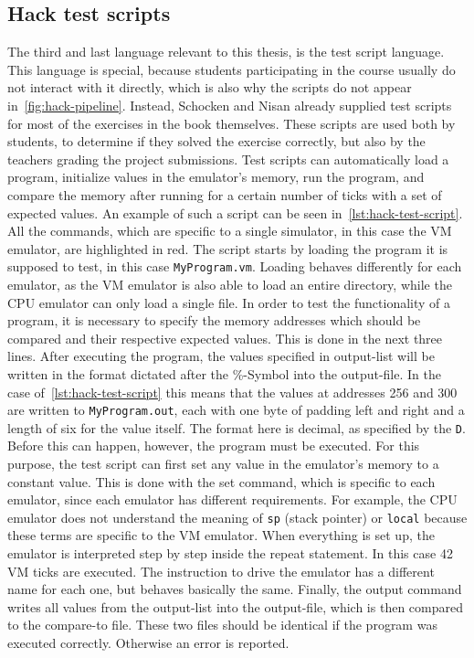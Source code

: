 \subsection{Hack test scripts} \label{test-scripts}
The third and last language relevant to this thesis, is the test script language.
This language is special, because students participating in the course usually do not interact with it directly, which is also why the scripts do not appear in~\cref{fig:hack-pipeline}.
Instead, Schocken and Nisan already supplied test scripts for most of the exercises in the book themselves.
These scripts are used both by students, to determine if they solved the exercise correctly, but also by the teachers grading the project submissions.
Test scripts can automatically load a program, initialize values in the emulator's memory, run the program, and compare the memory after running for a certain number of ticks with a set of expected values.
An example of such a script can be seen in~\cref{lst:hack-test-script}.
All the commands, which are specific to a single simulator, in this case the VM emulator, are highlighted in red.
The script starts by loading the program it is supposed to test, in this case \verb+MyProgram.vm+.
Loading behaves differently for each emulator, as the VM emulator is also able to load an entire directory, while the CPU emulator can only load a single file.
In order to test the functionality of a program, it is necessary to specify the memory addresses which should be compared and their respective expected values.
This is done in the next three lines.
After executing the program, the values specified in output-list will be written in the format dictated after the \%-Symbol into the output-file.
In the case of~\cref{lst:hack-test-script} this means that the values at addresses 256 and 300 are written to \verb+MyProgram.out+, each with one byte of padding left and right and a length of six for the value itself.
The format here is decimal, as specified by the \verb+D+.
Before this can happen, however, the program must be executed.
For this purpose, the test script can first set any value in the emulator's memory to a constant value.
This is done with the set command, which is specific to each emulator, since each emulator has different requirements.
For example, the CPU emulator does not understand the meaning of \verb+sp+ (stack pointer) or \verb+local+ because these terms are specific to the VM emulator.
When everything is set up, the emulator is interpreted step by step inside the repeat statement.
In this case 42 VM ticks are executed.
The instruction to drive the emulator has a different name for each one, but behaves basically the same.
Finally, the output command writes all values from the output-list into the output-file, which is then compared to the compare-to file.
These two files should be identical if the program was executed correctly.
Otherwise an error is reported.

